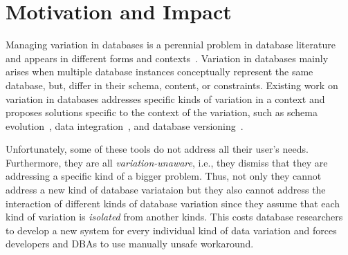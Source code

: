 \section{Motivation and Impact}
\label{sec:mot}


Managing variation in databases is a perennial problem in database literature
and appears in different forms and 
contexts~\cite{curateVdata,ALW21vamos,ready17cidr,clams16sigmod,datahub15cidr}.
%
Variation in databases mainly arises when multiple database instances 
conceptually represent the same database, but, differ
in their schema, content, or constraints. 
Existing work on variation in databases addresses specific  kinds of 
variation in a context and proposes solutions specific to the context of the
variation, such as  
schema evolution~\cite{SchEvolRA90McKenzie, 
schVersioning97Castro, tempSchEvol91Ariav, tsql95Snodgrass, 
prima08Moon}, 
data integration~\cite{dataIntegBook}, 
and database versioning~\cite{datasetVersioning,dbVersioning}.

%
Unfortunately, some of these tools do not address all their user's needs.
Furthermore, they are all \emph{variation-unaware}, i.e., they dismiss that
they are addressing a specific kind of a bigger problem. Thus, not only they 
cannot address a new kind of database variataion but they also cannot 
address the interaction of different kinds of database variation since they
assume that each kind of variation is \emph{isolated} from another
kinds. This costs database researchers
to develop a new system for every individual kind of data variation
and forces developers and DBAs to use manually unsafe workaround.


